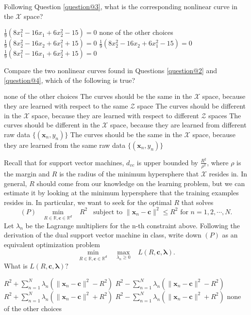 \documentclass[a4paper,10pt]{exam}
\begin{document}
\begin{questions}
	 \question Following Question \ref{question@3}, what is the corresponding nonlinear curve in the $\mathcal{X}$ space?
	 \begin{checkboxes}
	 	\CorrectChoice $\frac{1}{9}(8x_1^2-16x_1+6x_2^2 - 15) = 0$
	 	\choice none of the other choices
	 	\choice $\frac{1}{9}(8x_2^2-16x_2+6x_1^2 + 15) = 0$
	 	\choice $\frac{1}{9}(8x_2^2-16x_2+6x_1^2 - 15) = 0$
	 	\choice $\frac{1}{9}(8x_1^2-16x_1+6x_2^2 + 15) = 0$
	 \end{checkboxes}
	 
	\question Compare the two nonlinear curves found in Questions \ref{question@2} and \ref{question@4}, which of the following is true?
	\begin{checkboxes}
		\choice none of the other choices
		\choice The curves should be the same in the $\mathcal{X}$ space, because they are learned with respect to the same $\mathcal{Z}$ space
		\CorrectChoice The curves should be different in the $\mathcal{X}$ space, because they are learned with respect to different $\mathcal{Z}$ spaces
		\choice The curves should be different in the $\mathcal{X}$ space, because they are learned from different raw data $\{(\mathbf{x}_n, y_n)\}$
		\choice The curves should be the same in the $\mathcal{X}$ space, because they are learned from the same raw data $\{(\mathbf{x}_n, y_n)\}$
	\end{checkboxes}
	
	\question Recall that for support vector machines, $d_{vc}$ is upper bounded by $\frac{R^2}{\rho^2}$, where $\rho$ is the margin and $R$ is the radius of the minimum hypersphere that $\mathcal{X}$ resides in. In general, $R$ should come from our knowledge on the learning problem, but we can estimate it by looking at the minimum hypersphere that the training examples resides in. In particular, we want to seek for the optimal $R$ that solves \[(P) \; \; \; \min_{R \in \mathbb{R}, \mathbf{c} \in \mathbb{R}^d} \; \; \; R^2 \; \; \; \mbox{subject to } \|\mathbf{x}_n - \mathbf{c}\|^2 \le R^2 \mbox{ for } n = 1, 2, \cdots, N.\]
	Let $\lambda_n$ be the Lagrange multipliers for the n-th constraint above. Following the derivation of the dual support vector machine in class, write down $(P)$ as an equivalent optimization problem \[\min_{R \in \mathbb{R}, \mathbf{c} \in \mathbb{R}^d} \;\;\; \max_{\lambda_n \ge 0} \;\;\; L(R, \mathbf{c}, {\boldsymbol\lambda}).\] What is $L(R, \mathbf{c}, {\boldsymbol\lambda})?$
	
	\begin{checkboxes}
		\CorrectChoice $R^2 + \sum_{n=1}^N \lambda_n( \|\mathbf{x}_n - \mathbf{c}\|^2 - R^2)$
		\choice $R^2 - \sum_{n=1}^N \lambda_n( \|\mathbf{x}_n - \mathbf{c}\|^2 - R^2)$
		\choice $R^2 + \sum_{n=1}^N \lambda_n( \|\mathbf{x}_n - \mathbf{c}\|^2 + R^2)$
		\choice $R^2 - \sum_{n=1}^N \lambda_n( \|\mathbf{x}_n - \mathbf{c}\|^2 + R^2)$
		\choice none of the other choices
	\end{checkboxes}
	

\end{questions}
\end{document}
